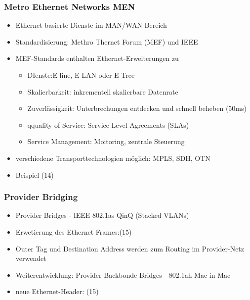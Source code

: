 \subsubsection{Metro Ethernet Networks MEN}
\begin{itemize}
	\item Ethernet-basierte Dienste im MAN/WAN-Bereich
	\item Standardisierung: Methro Thernet Forum (MEF) und IEEE
	\item MEF-Standards enthalten Ethernet-Erweiterungen zu
	\begin{itemize}
		\item DIenste:E-line, E-LAN oder E-Tree
		\item Skalierbarkeit: inkrementell skalierbare Datenrate
		\item Zuverlässigkeit: Unterbrechungen entdecken und schnell beheben (50ms)
		\item qquality of Service: Service Level Agreements (SLAs)
		\item Service Management: Moitoring, zentrale Steuerung
	\end{itemize}
	\item verschiedene Transporttechnologien möglich: MPLS, SDH, OTN
	\item Beispiel (14)
\end{itemize}
\subsubsection{Provider Bridging}
\begin{itemize}
	\item Provider Bridges - IEEE 802.1as QinQ (Stacked VLANs)
	\item Erwetierung des Ethernet Frames:(15)
	\item Outer Tag und Destination Address werden zum Routing im Provider-Netz verwendet
	\item Weiterentwicklung: Provider Backbonde Bridges - 802.1ah Mac-in-Mac
	\item neue Ethernet-Header: (15)
\end{itemize}
